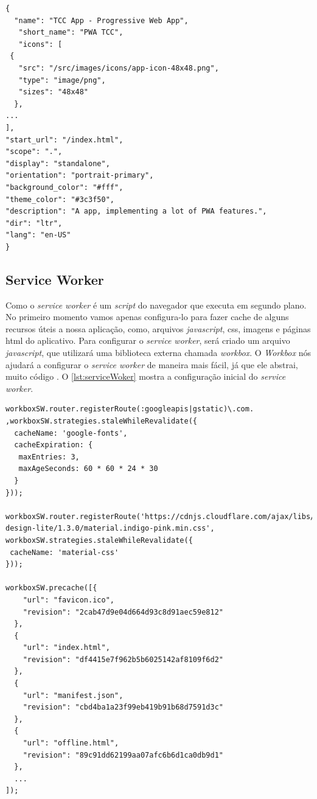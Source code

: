 \newpage

\begin{lstlisting}[frame=single,label=lst:arquivoManifest,caption=Arquivo Manifesto, basicstyle=\footnotesize,]
{
  "name": "TCC App - Progressive Web App",
   "short_name": "PWA TCC",
   "icons": [
 {
   "src": "/src/images/icons/app-icon-48x48.png",
   "type": "image/png",
   "sizes": "48x48"
  },
...
],
"start_url": "/index.html",
"scope": ".",
"display": "standalone",
"orientation": "portrait-primary",
"background_color": "#fff",
"theme_color": "#3c3f50",
"description": "A app, implementing a lot of PWA features.",
"dir": "ltr",
"lang": "en-US"
}
\end{lstlisting}
 \vspace{-0.75cm}
\begin{center}
\end{center}

\subsection{Service Worker}
Como o \textit{service worker} é um \textit{script} do navegador que executa em segundo plano. No primeiro momento vamos apenas configura-lo para fazer cache de alguns recursos úteis a nossa aplicação, como, arquivos \textit{javascript}, css, imagens e páginas html do aplicativo. Para configurar o \textit{service worker}, será criado um arquivo \textit{javascript}, que utilizará uma biblioteca externa chamada \textit{workbox}. O \textit{Workbox} nós ajudará a configurar o \textit{service worker} de maneira mais fácil, já que ele abstrai, muito código \cite{workbox}. O \autoref{lst:serviceWoker} mostra a configuração inicial do  \textit{service worker}.

\newpage

\begin{lstlisting}[frame=single,label=lst:serviceWoker,caption=Service Worker, basicstyle=\footnotesize]
workboxSW.router.registerRoute(:googleapis|gstatic)\.com.
,workboxSW.strategies.staleWhileRevalidate({
  cacheName: 'google-fonts',
  cacheExpiration: {
   maxEntries: 3,
   maxAgeSeconds: 60 * 60 * 24 * 30
  }
}));

workboxSW.router.registerRoute('https://cdnjs.cloudflare.com/ajax/libs/material-design-lite/1.3.0/material.indigo-pink.min.css', workboxSW.strategies.staleWhileRevalidate({
 cacheName: 'material-css'
}));

workboxSW.precache([{
    "url": "favicon.ico",
    "revision": "2cab47d9e04d664d93c8d91aec59e812"
  },
  {
    "url": "index.html",
    "revision": "df4415e7f962b5b6025142af8109f6d2"
  },
  {
    "url": "manifest.json",
    "revision": "cbd4ba1a23f99eb419b91b68d7591d3c"
  },
  {
    "url": "offline.html",
    "revision": "89c91dd62199aa07afc6b6d1ca0db9d1"
  },
  ...
]);

\end{lstlisting}

